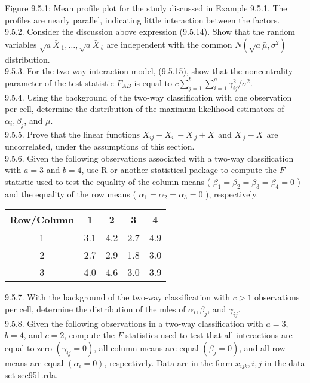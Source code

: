 Figure 9.5.1: Mean profile plot for the study discussed in Example 9.5.1. The profiles are nearly parallel, indicating little interaction between the factors.\\
9.5.2. Consider the discussion above expression (9.5.14). Show that the random variables $\sqrt{a} \bar{X}_{\cdot 1}, \ldots, \sqrt{a} \bar{X}_{\cdot b}$ are independent with the common $N\left(\sqrt{a} \bar{\mu}, \sigma^{2}\right)$ distribution.\\
9.5.3. For the two-way interaction model, (9.5.15), show that the noncentrality parameter of the test statistic $F_{A B}$ is equal to $c \sum_{j=1}^{b} \sum_{i=1}^{a} \gamma_{i j}^{2} / \sigma^{2}$.\\
9.5.4. Using the background of the two-way classification with one observation per cell, determine the distribution of the maximum likelihood estimators of $\alpha_{i}, \beta_{j}$, and $\mu$.\\
9.5.5. Prove that the linear functions $X_{i j}-\bar{X}_{i .}-\bar{X}_{. j}+\bar{X}_{. .}$and $\bar{X}_{. j}-\bar{X}_{. .}$are uncorrelated, under the assumptions of this section.\\
9.5.6. Given the following observations associated with a two-way classification with $a=3$ and $b=4$, use R or another statistical package to compute the $F$ statistic used to test the equality of the column means ( $\beta_{1}=\beta_{2}=\beta_{3}=\beta_{4}=0$ ) and the equality of the row means ( $\alpha_{1}=\alpha_{2}=\alpha_{3}=0$ ), respectively.

\begin{center}
\begin{tabular}{ccccc}
\hline
Row/Column & 1 & 2 & 3 & 4 \\
\hline
1 & 3.1 & 4.2 & 2.7 & 4.9 \\
2 & 2.7 & 2.9 & 1.8 & 3.0 \\
3 & 4.0 & 4.6 & 3.0 & 3.9 \\
\hline
\end{tabular}
\end{center}

9.5.7. With the background of the two-way classification with $c>1$ observations per cell, determine the distribution of the mles of $\alpha_{i}, \beta_{j}$, and $\gamma_{i j}$.\\
9.5.8. Given the following observations in a two-way classification with $a=3$, $b=4$, and $c=2$, compute the $F$-statistics used to test that all interactions are equal to zero $\left(\gamma_{i j}=0\right)$, all column means are equal $\left(\beta_{j}=0\right)$, and all row means are equal $\left(\alpha_{i}=0\right)$, respectively. Data are in the form $x_{i j k}, i, j$ in the data set sec951.rda.

